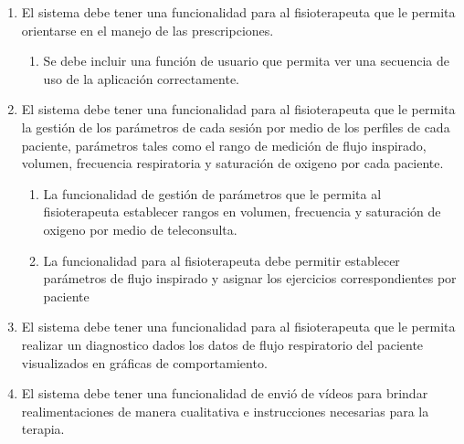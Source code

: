 \documentclass[12pt]{article}
\begin{document}
\begin{enumerate}[start=1,label={\bfseries RF0\arabic*.}]
\begin{enumerate}[label*=\arabic*.]
     
                
            \end{enumerate}
            
    \item  El sistema debe tener una funcionalidad para al fisioterapeuta que le permita orientarse en el manejo de las prescripciones.
    
    \label{RF03}
            \begin{enumerate}[label*=\arabic*.]
                \item Se debe incluir una función de usuario que permita ver una secuencia de uso de la aplicación correctamente. 
            \end{enumerate}
            
    
    \item  El sistema debe tener una funcionalidad para al fisioterapeuta que le permita la gestión de los parámetros de cada sesión por medio de los perfiles de cada paciente, parámetros tales como  el rango de medición de flujo inspirado, volumen, frecuencia respiratoria y saturación de oxigeno por cada paciente. %
    \label{RF04}
            \begin{enumerate}[label*=\arabic*.]
                \item La funcionalidad de gestión de parámetros que le permita al fisioterapeuta establecer rangos en volumen, frecuencia y saturación de oxigeno por medio de teleconsulta. %
                
                \item La funcionalidad para al fisioterapeuta debe permitir establecer parámetros de flujo inspirado y asignar los ejercicios correspondientes por paciente
                
                
            \end{enumerate}
            
    \item El sistema debe tener una funcionalidad para al fisioterapeuta que le permita realizar un diagnostico dados los datos de flujo respiratorio del paciente visualizados en gráficas de comportamiento.
    
    \item  El sistema debe tener una funcionalidad de envió de vídeos para brindar realimentaciones de manera cualitativa e instrucciones necesarias para la terapia.
    

\end{enumerate}
\end{document}
